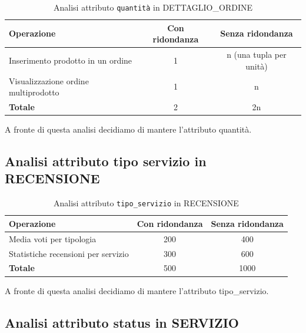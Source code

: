 \documentclass[a4paper,12pt]{report}
\begin{document}
\begin{table}[H]
	\centering
	\begin{tabular}{|l|c|c|}
		\hline
		\textbf{Operazione}                  & \textbf{Con ridondanza} & \textbf{Senza ridondanza} \\
		\hline
		Inserimento prodotto in un ordine    & 1                       & n (una tupla per unità)   \\
		Visualizzazione ordine multiprodotto & 1                       & n                         \\
		\hline
		\textbf{Totale}                      & 2                       & 2n                        \\
		\hline
	\end{tabular}
	\caption{Analisi attributo \texttt{quantità} in DETTAGLIO\_ORDINE}
\end{table}

A fronte di questa analisi decidiamo di mantere l'attributo quantità.

\subsection{Analisi attributo tipo servizio in RECENSIONE}

\begin{table}[H]
	\centering
	\begin{tabular}{|l|c|c|}
		\hline
		\textbf{Operazione}                 & \textbf{Con ridondanza} & \textbf{Senza ridondanza} \\
		\hline
		Media voti per tipologia            & 200                     & 400                       \\
		Statistiche recensioni per servizio & 300                     & 600                       \\
		\hline
		\textbf{Totale}                     & 500                     & 1000                      \\
		\hline
	\end{tabular}
	\caption{Analisi attributo \texttt{tipo\_servizio} in RECENSIONE}
\end{table}

A fronte di questa analisi decidiamo di mantere l'attributo tipo\_servizio.

\subsection{Analisi attributo status in SERVIZIO}
\end{document}
